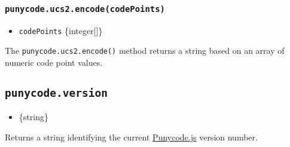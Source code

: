 \subsubsection{\texorpdfstring{\texttt{punycode.ucs2.encode(codePoints)}}{punycode.ucs2.encode(codePoints)}}\label{punycode.ucs2.encodecodepoints}

\begin{itemize}
\tightlist
\item
  \texttt{codePoints} \{integer{[}{]}\}
\end{itemize}

The \texttt{punycode.ucs2.encode()} method returns a string based on an
array of numeric code point values.

\begin{Shaded}
\begin{Highlighting}[]
\NormalTok{([}\OperatorTok{,} \OperatorTok{,} \NormalTok{])}\OperatorTok{;} 
\NormalTok{([}\NormalTok{])}\OperatorTok{;} 
\end{Highlighting}
\end{Shaded}

\subsection{\texorpdfstring{\texttt{punycode.version}}{punycode.version}}\label{punycode.version}

\begin{itemize}
\tightlist
\item
  \{string\}
\end{itemize}

Returns a string identifying the current
\href{https://github.com/bestiejs/punycode.js}{Punycode.js} version
number.
